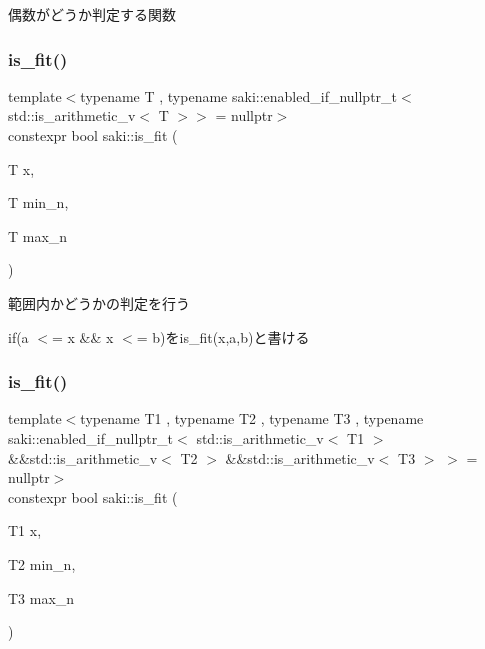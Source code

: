 偶数がどうか判定する関数 

\mbox{\label{namespacesaki_a419ec46a4eaf271747846aaa8e7df594}} 
\subsubsection{\texorpdfstring{is\+\_\+fit()}{is\_fit()}\hspace{0.1cm}{\footnotesize\ttfamily [1/2]}}
{\footnotesize\ttfamily template$<$typename T , typename saki\+::enabled\+\_\+if\+\_\+nullptr\+\_\+t$<$ std\+::is\+\_\+arithmetic\+\_\+v$<$ T $>$$>$  = nullptr$>$ \\
constexpr bool saki\+::is\+\_\+fit (\begin{DoxyParamCaption}\item[{T}]{x,  }\item[{T}]{min\+\_\+n,  }\item[{T}]{max\+\_\+n }\end{DoxyParamCaption})}



範囲内かどうかの判定を行う 

if(a $<$= x \&\& x $<$= b)をis\+\_\+fit(x,a,b)と書ける \mbox{\label{namespacesaki_aa8702191f3514794558097f7928dd57d}} 
\subsubsection{\texorpdfstring{is\+\_\+fit()}{is\_fit()}\hspace{0.1cm}{\footnotesize\ttfamily [2/2]}}
{\footnotesize\ttfamily template$<$typename T1 , typename T2 , typename T3 , typename saki\+::enabled\+\_\+if\+\_\+nullptr\+\_\+t$<$ std\+::is\+\_\+arithmetic\+\_\+v$<$ T1 $>$ \&\&std\+::is\+\_\+arithmetic\+\_\+v$<$ T2 $>$ \&\&std\+::is\+\_\+arithmetic\+\_\+v$<$ T3 $>$ $>$  = nullptr$>$ \\
constexpr bool saki\+::is\+\_\+fit (\begin{DoxyParamCaption}\item[{T1}]{x,  }\item[{T2}]{min\+\_\+n,  }\item[{T3}]{max\+\_\+n }\end{DoxyParamCaption})}



